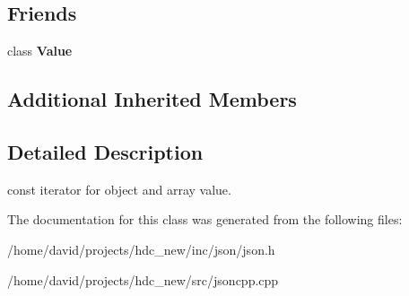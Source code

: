 \subsection*{Friends}
\begin{DoxyCompactItemize}
\item 
class {\bfseries Value}\hypertarget{class_json_1_1_value_const_iterator_aeceedf6e1a7d48a588516ce2b1983d6f}{}\label{class_json_1_1_value_const_iterator_aeceedf6e1a7d48a588516ce2b1983d6f}

\end{DoxyCompactItemize}
\subsection*{Additional Inherited Members}


\subsection{Detailed Description}
const iterator for object and array value. 



The documentation for this class was generated from the following files\+:\begin{DoxyCompactItemize}
\item 
/home/david/projects/hdc\+\_\+new/inc/json/json.\+h\item 
/home/david/projects/hdc\+\_\+new/src/jsoncpp.\+cpp\end{DoxyCompactItemize}
